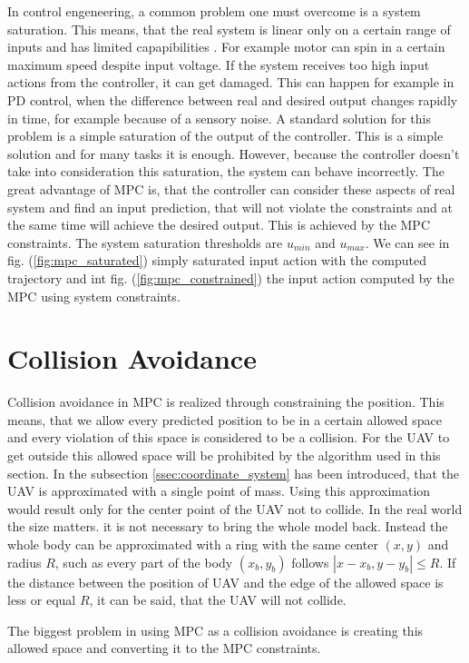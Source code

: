 \documentclass[a4paper,11pt,titlepage]{article}
\begin{document}
In control engeneering, a common problem one must overcome is a system saturation. This means, that the real system is linear only on a certain range of inputs and has limited capapibilities \cite{saturation}. For example motor can spin in a certain maximum speed despite input voltage. If the system receives too high input actions from the controller, it can get damaged. This can happen for example in PD control, when the difference between real and desired output changes rapidly in time, for example because of a sensory noise.
A standard  solution for this problem is a simple saturation of the output of the controller. This is a simple solution and for many tasks it is enough. However, because the controller doesn't take into consideration this saturation, the system can behave incorrectly.
The great advantage of MPC is, that the controller can consider these aspects of real system and find an input prediction, that will not violate the constraints and at the same time will achieve the desired output. This is achieved by the MPC constraints. The system saturation thresholds are $u_{min}$ and $u_{max}$. We can see in fig. (\ref{fig:mpc_saturated}) simply saturated input action with the computed trajectory and int fig. (\ref{fig:mpc_constrained}) the input action computed by the MPC using system constraints. 

\section{Collision Avoidance}
Collision avoidance in MPC is realized through constraining the position. This means, that we allow every predicted position to be in a certain allowed space and every violation of this space is considered to be a collision. For the UAV to get outside this allowed space will be prohibited by the algorithm used in this section. In the subsection \ref{ssec:coordinate_system} has been introduced, that the UAV is approximated with a single point of mass. Using this approximation would result only for the center point of the UAV not to collide. In the real world the size matters. it is not necessary to bring the whole model back. Instead the whole body can be approximated with a ring with the same center $(x, y)$ and radius $R$, such as every part of the body $(x_b, y_b)$ follows $|x - x_b, y - y_b| \leq R$. If the distance between the position of UAV and the edge of the allowed space is less or equal $R$, it can be said, that the UAV will not collide. 

The biggest problem in using MPC as a collision avoidance is creating this allowed space and converting it to the MPC constraints. 
\end{document}
